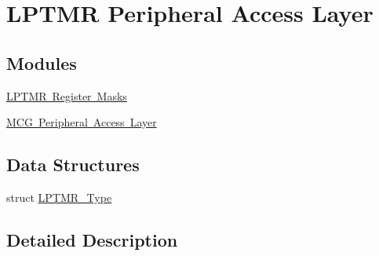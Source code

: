 \hypertarget{group___l_p_t_m_r___peripheral___access___layer}{}\section{L\+P\+T\+MR Peripheral Access Layer}
\label{group___l_p_t_m_r___peripheral___access___layer}
\subsection*{Modules}
\begin{DoxyCompactItemize}
\item 
\mbox{\hyperlink{group___l_p_t_m_r___register___masks}{L\+P\+T\+M\+R Register Masks}}
\item 
\mbox{\hyperlink{group___m_c_g___peripheral___access___layer}{M\+C\+G Peripheral Access Layer}}
\end{DoxyCompactItemize}
\subsection*{Data Structures}
\begin{DoxyCompactItemize}
\item 
struct \mbox{\hyperlink{struct_l_p_t_m_r___type}{L\+P\+T\+M\+R\+\_\+\+Type}}
\end{DoxyCompactItemize}


\subsection{Detailed Description}

